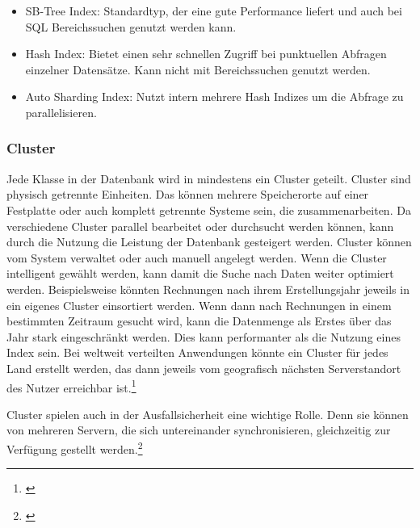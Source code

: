 \begin{itemize}
    \item SB-Tree Index: Standardtyp, der eine gute Performance liefert und auch bei \gls{SQL} Bereichssuchen genutzt werden kann.
    \item Hash Index: Bietet einen sehr schnellen Zugriff bei punktuellen Abfragen einzelner Datensätze. Kann nicht mit Bereichssuchen genutzt werden.
    \item Auto Sharding Index: Nutzt intern mehrere Hash Indizes um die Abfrage zu parallelisieren.
\end{itemize}


\subsubsection{Cluster}


Jede Klasse in der Datenbank wird in mindestens ein Cluster geteilt. Cluster sind physisch getrennte Einheiten. Das können mehrere Speicherorte auf einer Festplatte oder auch komplett getrennte Systeme sein, die zusammenarbeiten. Da verschiedene Cluster parallel bearbeitet oder durchsucht werden können, kann durch die Nutzung die Leistung der Datenbank gesteigert werden. Cluster können vom System verwaltet oder auch manuell angelegt werden. Wenn die Cluster intelligent gewählt werden, kann damit die Suche nach Daten weiter optimiert werden. Beispielsweise könnten Rechnungen nach ihrem Erstellungsjahr jeweils in ein eigenes Cluster einsortiert werden. Wenn dann nach Rechnungen in einem bestimmten Zeitraum gesucht wird, kann die Datenmenge als Erstes über das Jahr stark eingeschränkt werden. Dies kann performanter als die Nutzung eines Index sein. Bei weltweit verteilten Anwendungen könnte ein Cluster für jedes Land erstellt werden, das dann jeweils vom geografisch nächsten Serverstandort des Nutzer erreichbar ist.\footnote{\cite[Vgl.][]{OrientDBClusters}}

Cluster spielen auch in der Ausfallsicherheit eine wichtige Rolle. Denn sie können von mehreren Servern, die sich untereinander synchronisieren, gleichzeitig zur Verfügung gestellt werden.\footnote{\cite[Vgl.][]{OrientDBDistributedArchitecture}}

